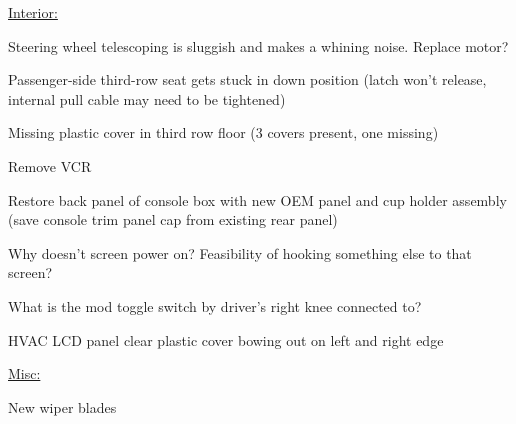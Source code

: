 \documentclass[12pt]{article}
\newcommand{\cmark}{\ding{51}}%
\newcommand{\xmark}{\ding{55}}%
\newcommand{\done}{\rlap{$\square$}{\raisebox{2pt}{\large\hspace{1pt}\cmark}}%
\hspace{-2.5pt}}
\newcommand{\wontfix}{\rlap{$\square$}{\large\hspace{1pt}\xmark}}
\begin{document}
\newpage

\vspace{0.25in}

\underline{\large Interior:}

\begin{todolist}
\item Steering wheel telescoping is sluggish and makes a whining noise.  Replace motor?
\item Passenger-side third-row seat gets stuck in down position (latch won't release, internal pull cable may need to be tightened)
\item Missing plastic cover in third row floor (3 covers present, one missing)
\item Remove VCR
\item Restore back panel of console box with new OEM panel and cup holder assembly (save console trim panel cap from existing rear panel)
\item Why doesn't screen power on?  Feasibility of hooking something else to that screen?
\item What is the mod toggle switch by driver's right knee connected to?
\item HVAC LCD panel clear plastic cover bowing out on left and right edge
\end{todolist}


\vspace{0.25in}

\underline{\large Misc:}

\begin{todolist}
\item New wiper blades
\end{todolist}

\end{document}
